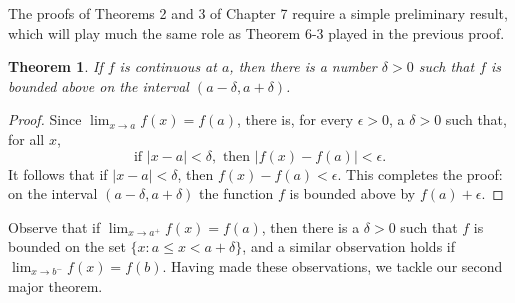 \documentclass{article}
\newtheorem{theorem}{Theorem}
\begin{document}
The proofs of Theorems 2 and 3 of Chapter 7 require a simple preliminary
result, which will play much the same role as Theorem 6-3 played in the
previous proof.

\begin{theorem}
  If $f$ is continuous at $a$, then there is a number $\delta > 0$ such that
  $f$ is bounded above on the interval $(a - \delta, a + \delta)$.
\end{theorem}
\begin{proof}
  Since $\lim_{x \to a} f(x) = f(a)$, there is, for every $\epsilon > 0$, a
  $\delta > 0$ such that, for all $x$, \[
    \text{if } |x - a| < \delta, \text{ then } |f(x) - f(a)| < \epsilon.
  \] It follows that if $|x - a| < \delta$, then $f(x) - f(a) < \epsilon$. This
  completes the proof: on the interval $(a - \delta, a + \delta)$ the function
  $f$ is bounded above by $f(a) + \epsilon$.
\end{proof}

Observe that if $\lim_{x \to a^+} f(x) = f(a)$, then there is a $\delta > 0$
such that $f$ is bounded on the set $\{x: a \leq x < a + \delta\}$, and a
similar observation holds if $\lim_{x \to b^-} f(x) = f(b)$. Having made these
observations, we tackle our second major theorem.
\end{document}

